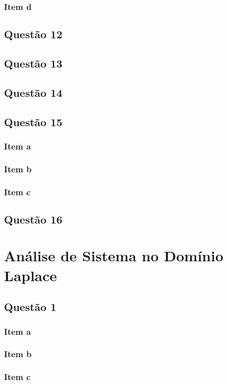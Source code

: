 \documentclass[a4paper, 12pt]{article}
\begin{document}
    \subsubsection{Item d}    
    \subsection{Quest\~{a}o 12}
    \subsection{Quest\~{a}o 13}
    \subsection{Quest\~{a}o 14}
    \subsection{Quest\~{a}o 15}
    \subsubsection{Item a} 
    \subsubsection{Item b} 
    \subsubsection{Item c}     
    \subsection{Quest\~{a}o 16}
    \section{An\'{a}lise de Sistema no Dom\'{i}nio Laplace}      
    \subsection{Quest\~{a}o 1}
    \subsubsection{Item a} 
    \subsubsection{Item b} 
    \subsubsection{Item c} 
\end{document}
